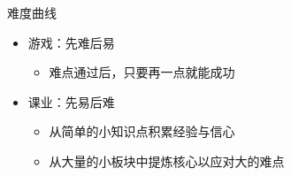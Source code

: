 \documentclass[]{beamer}
\begin{document}
\begin{frame}{难度曲线}
    \begin{itemize}
        \item 游戏：先难后易
        \begin{itemize}
            \item 难点通过后，只要再一点就能成功
        \end{itemize}
        \item 课业：先易后难
        \begin{itemize}
            \item 从简单的小知识点积累经验与信心
            \item 从大量的小板块中提炼核心以应对大的难点
        \end{itemize}
    \end{itemize}
\end{frame}
\end{document}
